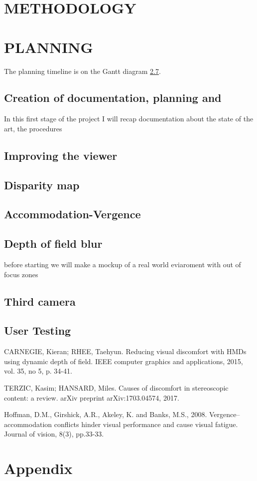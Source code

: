 \documentclass[10pt,a4paper,twocolumn,twoside]{article}
\begin{document}
\section{METHODOLOGY}

\section{PLANNING}
The planning timeline is on the Gantt diagram \ref{}.
\subsection{Creation of documentation, planning and }
In this first stage of the project I will recap documentation about the state of the art, the procedures 
\subsection{Improving the viewer}
\subsection{Disparity map}
\subsection{Accommodation-Vergence}
\subsection{Depth of field blur}
before starting we will make a mockup of a real world eviaroment with out of focus zones 
\subsection{Third camera}
\subsection{User Testing}

\begin{thebibliography}{11}
CARNEGIE, Kieran; RHEE, Taehyun. Reducing visual discomfort with HMDs using dynamic depth of field. IEEE computer graphics and applications, 2015, vol. 35, no 5, p. 34-41.

TERZIC, Kasim; HANSARD, Miles. Causes of discomfort in stereoscopic content: a review. arXiv preprint arXiv:1703.04574, 2017.

Hoffman, D.M., Girshick, A.R., Akeley, K. and Banks, M.S., 2008. Vergence–accommodation conflicts hinder visual performance and cause visual fatigue. Journal of vision, 8(3), pp.33-33.


\end{thebibliography}

\appendix

\section*{Appendix}
\end{document}
